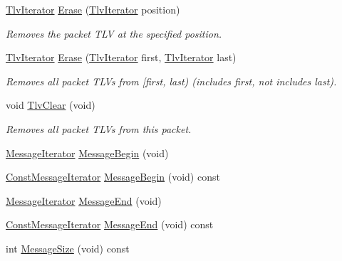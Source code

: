 \begin{DoxyCompactItemize}
\hyperlink{classns3_1_1PbbPacket_aed5b643d3a1c201bd4071eed0e2066d5}{Tlv\+Iterator} \hyperlink{classns3_1_1PbbPacket_a625fce53d5b0dbfc265d94342102bc9d}{Erase} (\hyperlink{classns3_1_1PbbPacket_aed5b643d3a1c201bd4071eed0e2066d5}{Tlv\+Iterator} position)
\begin{DoxyCompactList}\small\item\em Removes the packet T\+LV at the specified position. \end{DoxyCompactList}\item 
\hyperlink{classns3_1_1PbbPacket_aed5b643d3a1c201bd4071eed0e2066d5}{Tlv\+Iterator} \hyperlink{classns3_1_1PbbPacket_a76f387094fc936e5ec313d459fa7bfbd}{Erase} (\hyperlink{classns3_1_1PbbPacket_aed5b643d3a1c201bd4071eed0e2066d5}{Tlv\+Iterator} first, \hyperlink{classns3_1_1PbbPacket_aed5b643d3a1c201bd4071eed0e2066d5}{Tlv\+Iterator} last)
\begin{DoxyCompactList}\small\item\em Removes all packet T\+L\+Vs from \mbox{[}first, last) (includes first, not includes last). \end{DoxyCompactList}\item 
void \hyperlink{classns3_1_1PbbPacket_adfa30af31b9a4f5c5e6afa5469deb458}{Tlv\+Clear} (void)
\begin{DoxyCompactList}\small\item\em Removes all packet T\+L\+Vs from this packet. \end{DoxyCompactList}\item 
\hyperlink{classns3_1_1PbbPacket_a5fed659b1aebf8573c8f3aebe41e6013}{Message\+Iterator} \hyperlink{classns3_1_1PbbPacket_a78d131c19a9179e3e48427ae35705dc1}{Message\+Begin} (void)
\item 
\hyperlink{classns3_1_1PbbPacket_a59b58a11ce8de2cc2ff3c7fd7c4f1d10}{Const\+Message\+Iterator} \hyperlink{classns3_1_1PbbPacket_a849b0cef0266fb7d609c099885532d36}{Message\+Begin} (void) const 
\item 
\hyperlink{classns3_1_1PbbPacket_a5fed659b1aebf8573c8f3aebe41e6013}{Message\+Iterator} \hyperlink{classns3_1_1PbbPacket_a216fc11ab7b3cb96b5565f05b63b4e96}{Message\+End} (void)
\item 
\hyperlink{classns3_1_1PbbPacket_a59b58a11ce8de2cc2ff3c7fd7c4f1d10}{Const\+Message\+Iterator} \hyperlink{classns3_1_1PbbPacket_a5aaac45fcc27275d278724dadef466f1}{Message\+End} (void) const 
\item 
int \hyperlink{classns3_1_1PbbPacket_a042d7e7a51f505f3164c22adc724759e}{Message\+Size} (void) const 
\item 

\end{DoxyCompactItemize}
